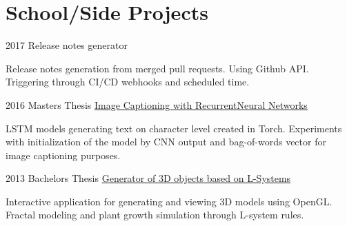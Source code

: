 \documentclass{tccv}
\begin{document}
\section{School/Side Projects}

\begin{eventlist}

	\item{2017}
	{}
	{Release notes generator}
	
	Release notes generation from merged pull requests. Using Github API. Triggering through CI/CD webhooks and scheduled time.

	\item{2016}
	{Masters Thesis}
	{{\href{https://github.com/kvitajakub/MasterThesis}{Image Captioning with Recurrent\newline Neural Networks}}}
	
	LSTM models generating text on character level created in Torch. Experiments with initialization of the model by CNN output and bag-of-words vector for image captioning purposes. 
	
	\item{2013}
	{Bachelors Thesis}
	{{\href{https://github.com/kvitajakub/LSystemModeller}{Generator of 3D objects based on L-Systems}}}
	
	Interactive application for generating and viewing 3D models using OpenGL. Fractal modeling and plant growth simulation through L-system rules.
	
\end{eventlist}
\end{document}
